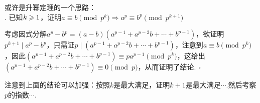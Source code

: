 \documentclass[11pt]{article}
\newcommand*{\QEDB}{\hfill\ensuremath{\square}}  %
\numberwithin{equation}{section}
\begin{document}
\pagestyle{main}    %
\thispagestyle{empty}
或许是升幂定理的一个思路：\\
. 已知$k \geqslant 1$，证明$a \equiv b \pmod{p^k} \Rightarrow a^p \equiv b^p \pmod{p^{k+1}}$
\begin{ZM}
    考虑因式分解$a^p-b^p = (a-b)(a^{p-1}+a^{p-2}b + \cdots + b^{p-1})$，欲证明$p^{k+1} \mid a^p-b^p$，只需证$p \mid (a^{p-1}+a^{p-2}b + \cdots + b^{p-1})$，注意到$a \equiv b \pmod{p^k}$，因此$(a^{p-1}+a^{p-2}b + \cdots + b^{p-1}) \equiv pa^{p-1} \pmod{p^k}$，这给出$(a^{p-1}+a^{p-2}b + \cdots + b^{p-1}) \equiv 0 \pmod{p}$，从而证明了结论. \QEDB
\end{ZM}
注意到上面的结论可以加强：按照$k$是最大满足，证明$k+1$是最大满足$\cdots$.然后考察$p$的指数$\cdots$.
\end{document}
